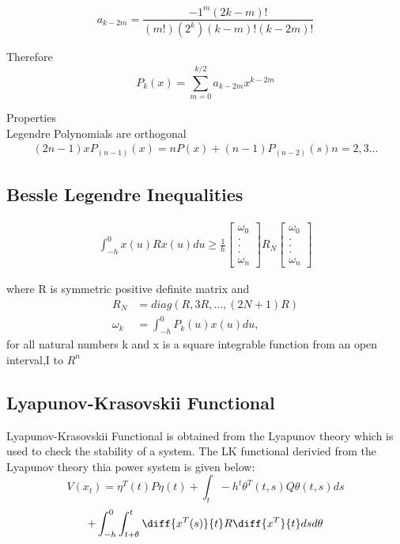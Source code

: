 \documentclass[journal]{IEEEtran}
\begin{document}
    \begin{equation}
    a_{k-2m} = \frac{-1^m(2k-m)!}{(m!)(2^k)(k-m)!(k-2m)!}
  \end{equation}


  
    Therefore
    \begin{equation}
      P_k(x) = \sum_{m=0}^{k/2} a_{k-2m}x^{k-2m}
  \end{equation}

   Properties \\
    Legendre Polynomials are orthogonal
    \begin{align}
    (2n-1)xP_(n-1)(x) = nP(x) + (n-1)P_(n-2)(s) n = 2, 3 ...
  \end{align}

\subsection{Bessle Legendre Inequalities}
 \begin{align}
   \int_{-h}^{0}x(u)Rx(u)du \geq \frac{1}{h}
   \begin{bmatrix}
     \omega_0 \\
     . \\
     . \\
     . \\
     \omega_n
   \end{bmatrix}
   R_N
   \begin{bmatrix}
  \omega_0 \\
  . \\
  . \\
  . \\
  \omega_n
\end{bmatrix}
 \end{align}

 where R is symmetric positive definite matrix
 and 
 \begin{align}
   R_N &= diag(R,3R,...,(2N+1)R) \\
   \omega_k&= \int_{-h}^{0}P_k(u)x(u)du, 
 \end{align}
 for all natural numbers k and x is a square integrable function
 from an open interval,I to $R^n$
\subsection{Lyapunov-Krasovskii Functional}
Lyapunov-Krasovskii Functional is obtained from the Lyapunov theory which is used to check the stability of a system. The LK functional derivied from the Lyapunov theory thia power system is given below:
\begin{equation*}
V(x_t) = \eta ^T (t)P \eta(t) + \int _t-h^t \theta ^T(t,s)Q\theta(t,s)ds 
\end{equation*}
\begin{equation*}
 +\int _{-h} ^0 \int _{t+\theta}^t\diff{x^T(s)}{t}R\diff{x^T}{t}dsd\theta
\end{equation*}
\end{document}
